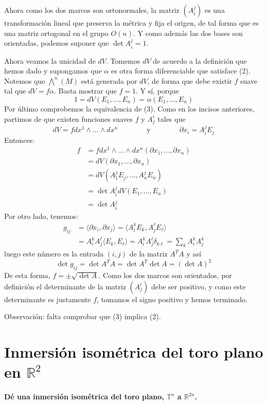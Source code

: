 \documentclass[11pt]{article}
\begin{document}
	Ahora como los dos marcos son ortonormales, la matriz $(A^j_i)$ es una transformación lineal que preserva la métrica y fija el origen, de tal forma que es una matriz ortogonal en el grupo $O(n)$. Y como además las dos bases son orientadas, podemos suponer que $\det{A^j_i}=1$.\par
	Ahora veamos la unicidad de $dV$. Tomemos $dV$ de acuerdo a la definición que hemos dado y supongamos que $\alpha$ es otra forma diferenciable que satisface (2). Notemos que $\bigwedge^n(M)$ está generada por $dV$, de forma que debe existir $f$ suave tal que $dV=f\alpha$. Basta mostrar que $f=1$. Y sí, porque
	$$1=dV(E_1,...,E_n)=\alpha(E_1,...,E_n)$$
	Por último comprobemos la equivalencia de (3). Como en los incisos anteriores, partimos de que existen funciones suaves $f$ y $A^i_j$ tales que
	$$dV=fdx^1\wedge...\wedge dx^n \qquad\qquad \text{y} \qquad \qquad\partial x_i=A^j_iE_j$$
	Entonces:
	\begin{align*}
		f&=fdx^1\wedge...\wedge dx^n(\partial x_1,...,\partial x_n)\\
		&=dV(\partial x_1,...,\partial x_n)\\
		&=dV(A^j_1E_j,...,A^j_nE_n)\\
		&=\det{A^j_i}dV(E_1,...,E_n)\\
		&=\det{A^j_i}
	\end{align*}
	Por otro lado, tenemos:
	\begin{align*}g_{ij}&=\langle \partial x_i,\partial x_j\rangle=\langle A^k_i E_k,A^\ell_jE_\ell\rangle\\
		&=A^k_iA^\ell_j\langle E_k,E_\ell\rangle=A^k_iA^\ell_j\delta_{k\ell}=\sum_kA^k_iA^k_j
	\end{align*}
	luego este número es la entrada $(i,j)$ de la matriz $A^TA$ y así
	$$\det{g_{ij}}=\det{A^TA}=\det{A^T}\det{A}=(\det{A})^2$$
	De esta forma, $f=\pm\sqrt{\det{A}}$. Como los dos marcos son orientados, por definición el determinante de la matriz $(A^i_j)$ debe ser positivo, y como este determinante es justamente $f$, tomamos el signo positivo y hemos terminado.\par
	Observación: falta comprobar que (3) implica (2).\newpage
	
	\section{Inmersión isométrica del toro plano en $\mathbb R^2$}
	\textbf{Dé una inmersión isométrica del toro plano, $\mathbb{T}^n$ a $\mathbb{R}^{2n}$.}
	
\end{document}
